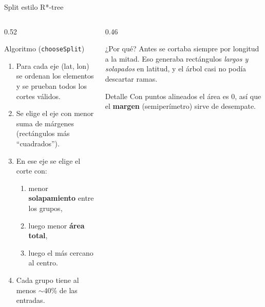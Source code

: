\documentclass[aspectratio=169,10pt]{beamer}
\begin{document}
\begin{frame}{Split estilo R*-tree}
  \begin{columns}[T]
    \begin{column}{0.52\textwidth}
      \begin{block}{Algoritmo (\texttt{chooseSplit})}
        \small
        \begin{enumerate}
          \item Para cada eje (lat, lon) se ordenan los elementos y se prueban todos los cortes válidos.
          \item Se elige el eje con \alert{menor suma de márgenes} (rectángulos más ``cuadrados'').
          \item En ese eje se elige el corte con:
            \begin{enumerate}\scriptsize
              \item menor \textbf{solapamiento} entre los grupos,
              \item luego menor \textbf{área total},
              \item luego el más cercano al centro.
            \end{enumerate}
          \item Cada grupo tiene al menos $\sim$40\% de las entradas.
        \end{enumerate}
      \end{block}
    \end{column}
    \begin{column}{0.46\textwidth}
      \begin{block}{¿Por qué?}
        \small
        Antes se cortaba siempre por longitud a la mitad. Eso generaba rectángulos \emph{largos y solapados} en latitud, y el árbol casi no podía descartar ramas.
      \end{block}
      \begin{block}{Detalle}
        \small
        Con puntos alineados el área es 0, así que el \textbf{margen} (semiperímetro) sirve de desempate.
      \end{block}
    \end{column}
  \end{columns}
\end{frame}
\end{document}
